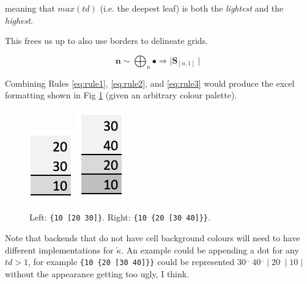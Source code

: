 \documentclass[11pt]{article}
\newcommand{\unit}{\bullet}
\begin{document}
meaning that $max(td)$ (i.e. the deepest leaf) is both the \emph{lightest} and the \emph{highest}.

This frees us up to also use borders to delineate grids.

\begin{equation} 
 \mathbf{n} \sim \bigoplus_n \unit \Rightarrow \mid \mathbf{S}_{[n,1]} \mid  \label{eq:rule3}
\end{equation}


Combining Rules \ref{eq:rule1}, \ref{eq:rule2}, and \ref{eq:rule3} would produce the excel formatting shown in Fig \ref{fig:format1} (given an arbitrary colour palette). 

\begin{figure}[h] 
\centering
  \includegraphics[scale=0.7]{screenshots/10_2030.png}
    \includegraphics[scale=0.7]{screenshots/10_20_3040.png}
  \caption{Left: \texttt{\{10 [20 30]\}}. Right:  \texttt{\{10 \{20 [30 40]\}\}}.}
  \label{fig:format1}
\end{figure}

Note that backends  that do not have cell background colours will need to have different implementations for $\overleftarrow{\kappa}$. An example could be appending a dot for any $td > 1$, for example \verb|{10 {20 [30 40]}}| could be represented $30^{..}\; 40^{..}\;|\;20^{.}\;|\;10\;|$ without the appearance getting too ugly, I think.
\end{document}
